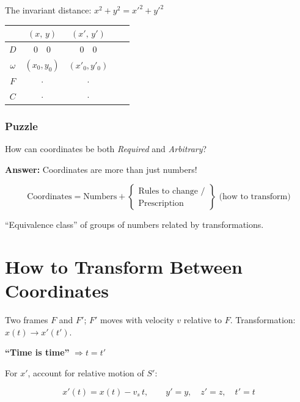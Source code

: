 The invariant distance: $x^2 + y^2 = x'^2 + y'^2$

\medskip

\begin{center}
\renewcommand{\arraystretch}{1.3}
\begin{tabular}{c|cc|cc}
  & $(x,\,y)$ & $(x',\,y')$ & & \\
  \hline
  $D$ & $0\quad 0$ & $0\quad 0$ & \multicolumn{2}{c}{} \\
  $\omega$ & $(x_0,y_0)$ & $(x'_0,y'_0)$ & & \\
  $F$ & $\cdot$ & $\cdot$ & & \\
  $C$ & $\cdot$ & $\cdot$ & & \\
\end{tabular}
\end{center}

\subsubsection*{Puzzle}

How can coordinates be both \emph{Required} and \emph{Arbitrary}?

\textbf{Answer:} Coordinates are more than just numbers!

\[
  \text{Coordinates} = \text{Numbers} + \left\{
    \begin{array}{l}
      \text{Rules to change /} \\
      \text{Prescription}
    \end{array}
  \right\} \text{ (how to transform)}
\]

``Equivalence class'' of groups of numbers related by transformations.

\section*{How to Transform Between Coordinates}

Two frames $F$ and $F'$; $F'$ moves with velocity $v$ relative to $F$.
Transformation: $x(t) \longrightarrow x'(t')$.

\vspace{0.5em}

\textbf{``Time is time''} $\Rightarrow t = t'$

For $x'$, account for relative motion of $S'$:

\begin{equation*}
  x'(t) = x(t) - v_s\,t, \qquad y'=y, \quad z'=z, \quad t'=t
\end{equation*}

